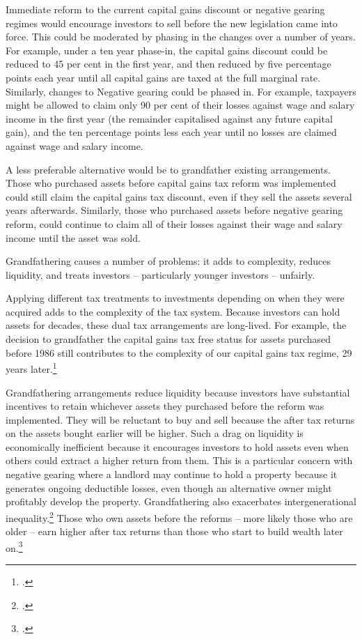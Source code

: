 \documentclass{grattan}\usepackage[]{graphicx}\usepackage[]{color}
\begin{document}
Immediate reform to the current capital gains discount or negative gearing regimes would encourage investors to sell before the new legislation came into force. This could be moderated by phasing in the changes over a number of years. For example, under a ten year phase-in, the capital gains discount could be reduced to 45 per cent in the first year, and then reduced by five percentage points each year until all capital gains are taxed at the full marginal rate. Similarly, changes to Negative gearing could be phased in. For example, taxpayers might be allowed to claim only 90 per cent of their losses against wage and salary income in the first year (the remainder capitalised against any future capital gain), and the ten percentage points less each year until no losses are claimed against wage and salary income.

A less preferable alternative would be to grandfather existing arrangements. Those who purchased assets before capital gains tax reform was implemented could still claim the capital gains tax discount, even if they sell the assets several years afterwards. Similarly, those who purchased assets before negative gearing reform, could continue to claim all of their losses against their wage and salary income until the asset was sold.

Grandfathering causes a number of problems: it adds to complexity, reduces liquidity, and treats investors -- particularly younger investors -- unfairly.

Applying different tax treatments to investments depending on when they were acquired adds to the complexity of the tax system. Because investors can hold assets for decades, these dual tax arrangements are long-lived.  For example, the decision to grandfather the capital gains tax free status for assets purchased before 1986 still contributes to the complexity of our capital gains tax regime, 29 years later.\footcite[p.~75]{Treasury2010} 

Grandfathering arrangements reduce liquidity because investors have substantial incentives to retain whichever assets they purchased before the reform was implemented. They will be reluctant to buy and sell because the after tax returns on the assets bought earlier will be higher. Such a drag on liquidity is economically inefficient because it encourages investors to hold assets even when others could extract a higher return from them. This is a particular concern with negative gearing where a landlord may continue to hold a property because it generates ongoing deductible losses, even though an alternative owner might profitably develop the property. Grandfathering also exacerbates intergenerational inequality.\footcite{Daley2014}  Those who own assets before the reforms -- more likely those who are older -- earn higher after tax returns than those who start to build wealth later on.\footcite[p.~14]{Daley2014} 
\end{document}
